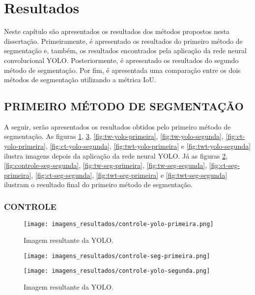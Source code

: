 \section{Resultados}

Neste capítulo são apresentados os resultados dos métodos propostos nesta dissertação. Primeiramente, é apresentado os resultados do primeiro método de segmentação e, também, os resultados encontrados pela aplicação da rede neural convolucional YOLO. Posteriormente, é apresentado os resultados do segundo método de segmentação. Por fim, é apresentada uma comparação entre os dois métodos de segmentação utilizando a métrica IoU.

\subsection{PRIMEIRO MÉTODO DE SEGMENTAÇÃO}

A seguir, serão apresentados os resultados obtidos pelo primeiro método de segmentação. As figuras \ref{fig:controle-yolo-primeira}, \ref{fig:controle-yolo-segunda}, \ref{fig:tw-yolo-primeira}, \ref{fig:tw-yolo-segunda}, \ref{fig:ct-yolo-primeira}, \ref{fig:ct-yolo-segunda}, \ref{fig:twt-yolo-primeira} e \ref{fig:twt-yolo-segunda} ilustra imagens depois da aplicação da rede neural YOLO. Já as figuras \ref{fig:controle-seg-primeira}, \ref{fig:controle-seg-segunda}, \ref{fig:tw-seg-primeira}, \ref{fig:tw-seg-segunda}, \ref{fig:ct-seg-primeira}, \ref{fig:ct-seg-segunda}, \ref{fig:twt-seg-primeira} e \ref{fig:twt-seg-segunda} ilustram o resultado final do primeiro método de segmentação.

\subsubsection{CONTROLE}

\begin{figure}[!h]
    \centering
    \texttt{[image: imagens\_resultados/controle-yolo-primeira.png]}
    \caption{Imagem resultante da YOLO.}
    \label{fig:controle-yolo-primeira}
\end{figure}

\begin{figure}[!h]
    \centering
    \texttt{[image: imagens\_resultados/controle-seg-primeira.png]}
    \caption{}
    \label{fig:controle-seg-primeira}
\end{figure}

\begin{figure}[!h]
    \centering
    \texttt{[image: imagens\_resultados/controle-yolo-segunda.png]}
    \caption{Imagem resultante da YOLO.}
    \label{fig:controle-yolo-segunda}
\end{figure}

